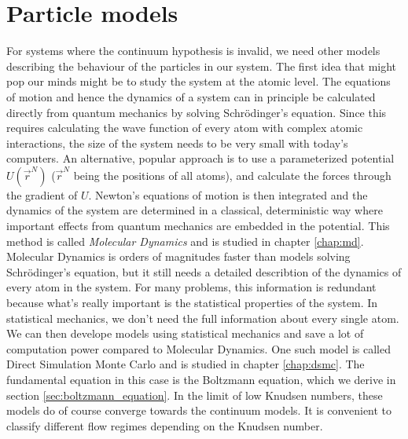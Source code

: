 \section{Particle models}
\label{sec:theory_of_fluids_atomic_models}
For systems where the continuum hypothesis is invalid, we need other models describing the behaviour of the particles in our system. The first idea that might pop our minds might be to study the system at the atomic level. The equations of motion and hence the dynamics of a system can in principle be calculated directly from quantum mechanics by solving Schr\"{o}dinger's equation. Since this requires calculating the wave function of every atom with complex atomic interactions, the size of the system needs to be very small with today's computers. An alternative, popular approach is to use a parameterized potential $U(\vec r^N)$ ($\vec r^N$ being the positions of all atoms), and calculate the forces through the gradient of $U$. Newton's equations of motion is then integrated and the dynamics of the system are determined in a classical, deterministic way where important effects from quantum mechanics are embedded in the potential. This method is called \textit{Molecular Dynamics} and is studied in chapter \ref{chap:md}. Molecular Dynamics is orders of magnitudes faster than models solving Schr\"{o}dinger's equation, but it still needs a detailed describtion of the dynamics of every atom in the system. For many problems, this information is redundant because what's really important is the statistical properties of the system. In statistical mechanics, we don't need the full information about every single atom. We can then develope models using statistical mechanics and save a lot of computation power compared to Molecular Dynamics. One such model is called Direct Simulation Monte Carlo and is studied in chapter \ref{chap:dsmc}. The fundamental equation in this case is the Boltzmann equation, which we derive in section \ref{sec:boltzmann_equation}. In the limit of low Knudsen numbers, these models do of course converge towards the continuum models. It is convenient to classify different flow regimes depending on the Knudsen number.
